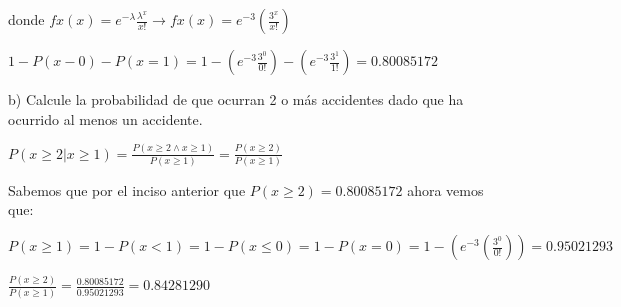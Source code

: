 donde $fx(x)=e^{-\lambda}\frac{\lambda^{x}}{x!}\rightarrow fx(x)=e^{-3}(\frac{3^{x}}{x!})$

$1-P(x-0)-P(x=1)=1-(e^{-3}\frac{3^{0}}{0!})-(e^{-3}\frac{3^{1}}{1!}) = 0.80085172$

b) Calcule la probabilidad de que ocurran 2 o m\'as accidentes dado que ha ocurrido
al menos un accidente.

$P(x \geq 2 | x \geq 1) = \frac{P(x \geq 2 \land x \geq 1)}{P(x \geq 1)} = 
\frac{P(x \geq 2)}{P(x \geq 1)}$

Sabemos que por el inciso anterior que $P(x \geq 2) = 0.80085172$ ahora vemos que:

$P(x \geq 1)=1-P(x<1) = 1-P(x \leq 0) = 1-P(x=0) = 1-(e^{-3}(\frac{3^{0}}{0!})) = 0.95021293$

$\frac{P(x \geq 2)}{P(x \geq 1)} = \frac{0.80085172}{0.95021293} = 0.84281290$
